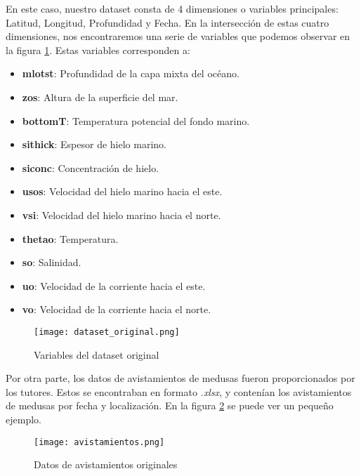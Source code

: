 En este caso, nuestro dataset consta de 4 dimensiones o variables principales: Latitud, Longitud, Profundidad y Fecha.
En la intersección de estas cuatro dimensiones, nos encontraremos una serie de variables que podemos observar en la figura \ref{fig:dataset_inicial}. Estas variables corresponden a:
\begin{itemize}
	\setlength\itemsep{-1.5em}
	\item \textbf{mlotst}: Profundidad de la capa mixta del océano.\\
	\item \textbf{zos}: Altura de la superficie del mar.\\
	\item \textbf{bottomT}: Temperatura potencial del fondo marino.\\
	\item \textbf{sithick}: Espesor de hielo marino.\\
	\item \textbf{siconc}: Concentración de hielo.\\
	\item \textbf{usos}: Velocidad del hielo marino hacia el este.\\
	\item \textbf{vsi}: Velocidad del hielo marino hacia el norte.\\
	\item \textbf{thetao}: Temperatura.\\
	\item \textbf{so}: Salinidad.\\
	\item \textbf{uo}: Velocidad de la corriente hacia el este.\\
	\item \textbf{vo}: Velocidad de la corriente hacia el norte.
\end{itemize}

\begin{figure}[!h]
	\centering
	\texttt{[image: dataset\_original.png]}
	\caption{Variables del dataset original}\label{fig:dataset_inicial}
\end{figure}

Por otra parte, los datos de avistamientos de medusas fueron proporcionados por los tutores. Estos se encontraban en formato \emph{.xlsx}, y contenían los avistamientos de medusas por fecha y localización. En la figura \ref{fig:avistamientos} se puede ver un pequeño ejemplo.

\begin{figure}[!h]
	\centering
	\texttt{[image: avistamientos.png]}
	\caption{Datos de avistamientos originales}\label{fig:avistamientos}
\end{figure}

